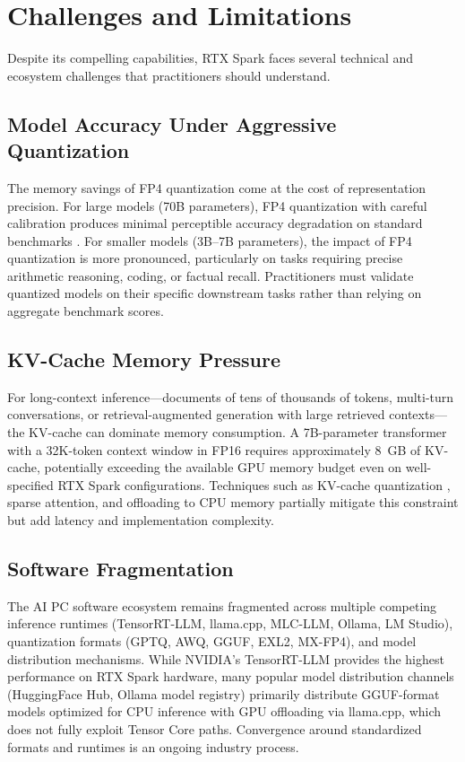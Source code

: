 \documentclass[conference]{IEEEtran}
\begin{document}
\section{Challenges and Limitations}
\label{sec:challenges}

Despite its compelling capabilities, RTX Spark faces several technical and ecosystem challenges that practitioners should understand.

\subsection{Model Accuracy Under Aggressive Quantization}

The memory savings of FP4 quantization come at the cost of representation precision. For large models (70B parameters), FP4 quantization with careful calibration produces minimal perceptible accuracy degradation on standard benchmarks \cite{dettmers2022gptq}. For smaller models (3B--7B parameters), the impact of FP4 quantization is more pronounced, particularly on tasks requiring precise arithmetic reasoning, coding, or factual recall. Practitioners must validate quantized models on their specific downstream tasks rather than relying on aggregate benchmark scores.

\subsection{KV-Cache Memory Pressure}

For long-context inference---documents of tens of thousands of tokens, multi-turn conversations, or retrieval-augmented generation with large retrieved contexts---the KV-cache can dominate memory consumption. A 7B-parameter transformer with a 32K-token context window in FP16 requires approximately 8~GB of KV-cache, potentially exceeding the available GPU memory budget even on well-specified RTX Spark configurations. Techniques such as KV-cache quantization \cite{liu2024kivi}, sparse attention, and offloading to CPU memory partially mitigate this constraint but add latency and implementation complexity.

\subsection{Software Fragmentation}

The AI PC software ecosystem remains fragmented across multiple competing inference runtimes (TensorRT-LLM, llama.cpp, MLC-LLM, Ollama, LM Studio), quantization formats (GPTQ, AWQ, GGUF, EXL2, MX-FP4), and model distribution mechanisms. While NVIDIA's TensorRT-LLM provides the highest performance on RTX Spark hardware, many popular model distribution channels (HuggingFace Hub, Ollama model registry) primarily distribute GGUF-format models optimized for CPU inference with GPU offloading via llama.cpp, which does not fully exploit Tensor Core paths. Convergence around standardized formats and runtimes is an ongoing industry process.
\end{document}
